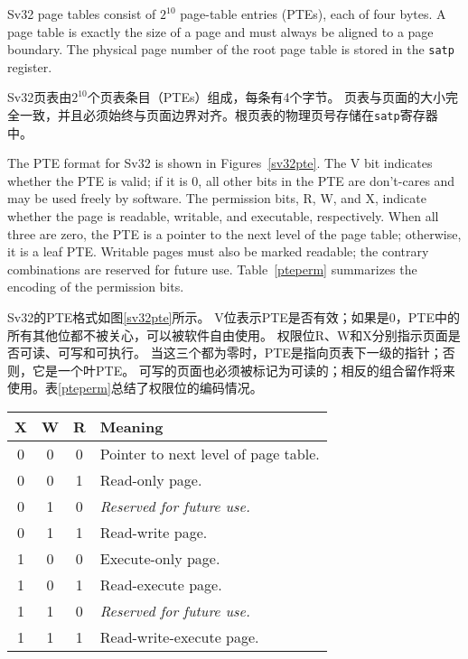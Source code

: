 Sv32 page tables consist of $2^{10}$ page-table entries (PTEs), each
of four bytes.  A page table is exactly the size of a page and must
always be aligned to a page boundary.  The physical page number of the
root page table is stored in the {\tt satp} register.

Sv32页表由$2^{10}$个页表条目（PTEs）组成，每条有4个字节。
页表与页面的大小完全一致，并且必须始终与页面边界对齐。根页表的物理页号存储在{\tt satp}寄存器中。

The PTE format for Sv32 is shown in Figures~\ref{sv32pte}.  The V bit
indicates whether the PTE is valid; if it is 0, all other bits in the PTE are
don't-cares and may be used freely by software.  The permission bits, R, W,
and X, indicate whether the page is readable, writable, and executable,
respectively.  When all three are zero, the PTE is a pointer to the next level
of the page table; otherwise, it is a leaf PTE.  Writable pages must also be
marked readable; the contrary combinations are reserved for future use.
Table~\ref{pteperm} summarizes the encoding of the permission bits.

Sv32的PTE格式如图\ref{sv32pte}所示。
V位表示PTE是否有效；如果是0，PTE中的所有其他位都不被关心，可以被软件自由使用。
权限位R、W和X分别指示页面是否可读、可写和可执行。
当这三个都为零时，PTE是指向页表下一级的指针；否则，它是一个叶PTE。
可写的页面也必须被标记为可读的；相反的组合留作将来使用。表\ref{pteperm}总结了权限位的编码情况。

\begin{table*}[h!]
\begin{center}
\begin{tabular}{|c|c|c||l|}
\hline
X & W & R & Meaning \\
\hline
0 & 0 & 0 & Pointer to next level of page table. \\
0 & 0 & 1 & Read-only page. \\
0 & 1 & 0 & {\em Reserved for future use.} \\
0 & 1 & 1 & Read-write page. \\
1 & 0 & 0 & Execute-only page. \\
1 & 0 & 1 & Read-execute page. \\
1 & 1 & 0 & {\em Reserved for future use.} \\
1 & 1 & 1 & Read-write-execute page. \\
\hline
\end{tabular}
\end{center}
\caption{Encoding of PTE R/W/X fields.}
\label{pteperm}
\end{table*}

